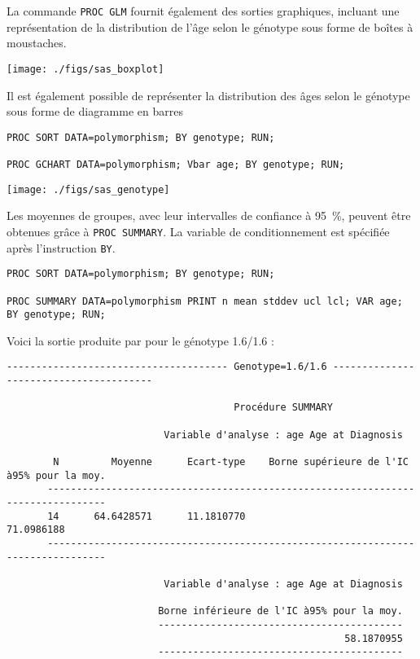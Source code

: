 La commande \texttt{PROC GLM} fournit également des sorties graphiques,
incluant une représentation de la distribution de l'âge selon le génotype
sous forme de boîtes à moustaches.

\texttt{[image: ./figs/sas\_boxplot]}

Il est également possible de représenter la distribution des âges selon le
génotype sous forme de diagramme en barres
\begin{verbatim}
PROC SORT DATA=polymorphism; BY genotype; RUN;

PROC GCHART DATA=polymorphism; Vbar age; BY genotype; RUN;
\end{verbatim}

\texttt{[image: ./figs/sas\_genotype]}

Les moyennes de groupes, avec leur intervalles de confiance à 95~\%, peuvent
être obtenues grâce à \texttt{PROC SUMMARY}. La variable de conditionnement
est spécifiée après l'instruction \texttt{BY}.
\begin{verbatim}
PROC SORT DATA=polymorphism; BY genotype; RUN;

PROC SUMMARY DATA=polymorphism PRINT n mean stddev ucl lcl; VAR age; BY genotype; RUN;
\end{verbatim}
Voici la sortie produite par \SAS pour le génotype 1.6/1.6 :

\begin{verbatim}
-------------------------------------- Genotype=1.6/1.6 ---------------------------------------

                                       Procédure SUMMARY

                           Variable d'analyse : age Age at Diagnosis

        N         Moyenne      Ecart-type    Borne supérieure de l'IC à95% pour la moy.
       --------------------------------------------------------------------------------
       14      64.6428571      11.1810770                                    71.0986188
       --------------------------------------------------------------------------------

                           Variable d'analyse : age Age at Diagnosis

                          Borne inférieure de l'IC à95% pour la moy.
                          ------------------------------------------
                                                          58.1870955
                          ------------------------------------------
\end{verbatim}

